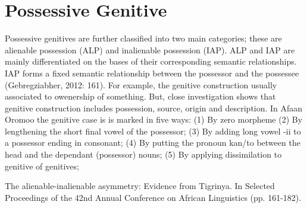 \documentclass[11pt,a4paper]{article}
\begin{document}
	
	
\section{Possessive Genitive}
	
 
	 Possessive genitives are further classified into two main categories; these are alienable possession (ALP) and inalienable possession (IAP). ALP and IAP are mainly differentiated on the bases of their corresponding semantic relationships. IAP forms a fixed semantic relationship between the possessor and the possessee (Gebregziabher, 2012: 161). For example, the genitive construction usually associated to owenership of something. But, close investigation shows that genitive construction includes possession, source, origin and description. In Afaan Oromoo the genitive case is is marked in five ways: (1) By zero morpheme (2) By lengthening the short final vowel of the possessor; (3) By adding long vowel -ii to a possessor ending in consonant; (4) By putting the pronoun kan/to between the head and the dependant (possessor) nouns; (5) By applying dissimilation to genitive of genitives; 
	
		The alienable-inalienable asymmetry: Evidence from Tigrinya. In Selected Proceedings of the 42nd Annual Conference on African Linguistics (pp. 161-182).
	
\end{document}
